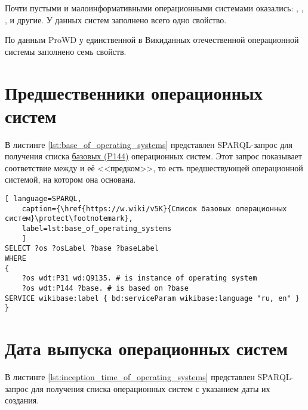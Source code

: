 Почти пустыми и малоинформативными операционными системами оказались: , , , и другие. У данных систем заполнено всего одно свойство\cite{prowd_os_link}.

По данным ProWD у единственной в Викиданных отечественной операционной системы  заполнено семь свойств\cite{prowd_os_link_ru}.

\section{Предшественники операционных систем}
В листинге \ref{lst:base_of_operating_systems} представлен SPARQL-запрос для получения списка \href{https://www.wikidata.org/wiki/Property_talk:P144}{базовых (P144)} операционных систем. Этот запрос показывает соответствие между  и её <<предком>>, то есть предшествующей операционной системой, на котором она основана.


\begin{lstlisting}[ language=SPARQL, 
	caption={\href{https://w.wiki/v5K}{Список базовых операционных систем}\protect\footnotemark},
	label=lst:base_of_operating_systems
	]
SELECT ?os ?osLabel ?base ?baseLabel
WHERE
{
	?os wdt:P31 wd:Q9135. # is instance of operating system
	?os wdt:P144 ?base. # is based on ?base
SERVICE wikibase:label { bd:serviceParam wikibase:language "ru, en" }
}
\end{lstlisting}

\section{Дата выпуска операционных систем}

В листинге \ref{lst:inception_time_of_operating_systems} представлен SPARQL-запрос для получения списка операционных систем с указанием даты их создания.

